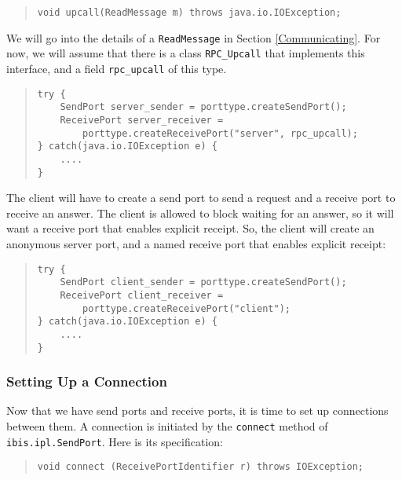 \documentclass[10pt]{article}
\begin{document}
\begin{quote}
\begin{verbatim}
void upcall(ReadMessage m) throws java.io.IOException;
\end{verbatim}
\end{quote}

We will go into the details of a \verb+ReadMessage+ in Section
\ref{Communicating}. For now, we will assume that there is a
class \verb+RPC_Upcall+ that implements this interface, and
a field \verb+rpc_upcall+ of this type.

\begin{quote}
\begin{verbatim}
try {
    SendPort server_sender = porttype.createSendPort();
    ReceivePort server_receiver =
        porttype.createReceivePort("server", rpc_upcall);
} catch(java.io.IOException e) {
    ....
}
\end{verbatim}
\end{quote}

The client will have to create a send port
to send a request and a receive port to receive an answer.
The client is allowed to block waiting for an answer, so it will
want a receive port that enables explicit receipt.
So, the client will create an anonymous server port, and a named
receive port that enables explicit receipt:

\begin{quote}
\begin{verbatim}
try {
    SendPort client_sender = porttype.createSendPort();
    ReceivePort client_receiver =
        porttype.createReceivePort("client");
} catch(java.io.IOException e) {
    ....
}
\end{verbatim}
\end{quote}

\subsubsection{Setting Up a Connection}

Now that we have send ports and receive ports, it is time to set up
connections between them.
A connection is initiated by the \verb+connect+ method of
\verb+ibis.ipl.SendPort+.
Here is its specification:

\begin{quote}
\begin{verbatim}
void connect (ReceivePortIdentifier r) throws IOException;
\end{verbatim}
\end{quote}
\end{document}
